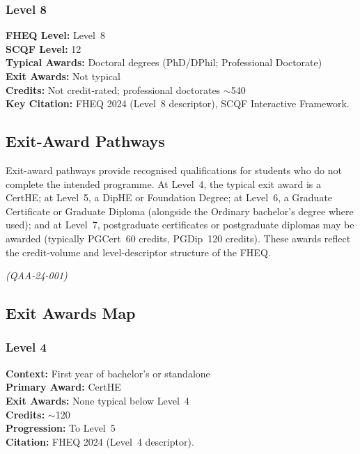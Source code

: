 \subsubsection*{Level 8}

\begin{tcolorbox}
\textbf{FHEQ Level:} Level~8 \\
\textbf{SCQF Level:} 12 \\
\textbf{Typical Awards:} Doctoral degrees (PhD/DPhil; Professional Doctorate) \\
\textbf{Exit Awards:} Not typical \\
\textbf{Credits:} Not credit-rated; professional doctorates $\sim$540 \\
\textbf{Key Citation:} FHEQ 2024 (Level~8 descriptor), SCQF Interactive Framework.
\end{tcolorbox}

\subsection{Exit-Award Pathways}

Exit-award pathways provide recognised qualifications for students who do not complete the 
intended programme. At Level~4, the typical exit award is a CertHE; at Level~5, a DipHE or 
Foundation Degree; at Level~6, a Graduate Certificate or Graduate Diploma (alongside the 
Ordinary bachelor’s degree where used); and at Level~7, postgraduate certificates or 
postgraduate diplomas may be awarded (typically PGCert~60 credits, PGDip~120 credits). These 
awards reflect the credit-volume and level-descriptor structure of the FHEQ.

\textit{(QAA-24-001)}

\subsection{Exit Awards Map}

\subsubsection*{Level 4}

\begin{tcolorbox}
\textbf{Context:} First year of bachelor's or standalone \\
\textbf{Primary Award:} CertHE \\
\textbf{Exit Awards:} None typical below Level~4 \\
\textbf{Credits:} $\sim$120 \\
\textbf{Progression:} To Level~5 \\
\textbf{Citation:} FHEQ 2024 (Level~4 descriptor).
\end{tcolorbox}

